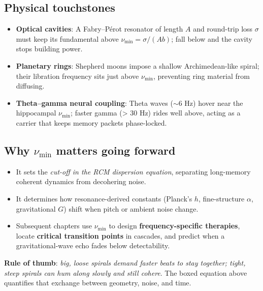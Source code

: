 \subsection{Physical touchstones}
\begin{itemize}
  \item \textbf{Optical cavities}: A Fabry–Pérot resonator of length \(A\) and round-trip loss \(\sigma\) must keep its fundamental above \(\nu_{\min}=\sigma/(A b)\); fall below and the cavity stops building power.
  \item \textbf{Planetary rings}: Shepherd moons impose a shallow Archimedean-like spiral; their libration frequency sits just above \(\nu_{\min}\), preventing ring material from diffusing.
  \item \textbf{Theta–gamma neural coupling}: Theta waves (\(\sim6\) Hz) hover near the hippocampal \(\nu_{\min}\); faster gamma (> 30 Hz) rides well above, acting as a carrier that keeps memory packets phase-locked.
\end{itemize}

\subsection{Why \(\nu_{\min}\) matters going forward}
\begin{itemize}
  \item It sets the \emph{cut-off in the RCM dispersion equation}, separating long-memory coherent dynamics from decohering noise.
  \item It determines how resonance-derived constants (Planck’s \(h\), fine-structure \(\alpha\), gravitational \(G\)) shift when pitch or ambient noise change.
  \item Subsequent chapters use \(\nu_{\min}\) to design \textbf{frequency-specific therapies}, locate \textbf{critical transition points} in cascades, and predict when a gravitational-wave echo fades below detectability.
\end{itemize}

\medskip
\noindent\textbf{Rule of thumb}: \emph{big, loose spirals demand faster beats to stay together; tight, steep spirals can hum along slowly and still cohere}.  
The boxed equation above quantifies that exchange between geometry, noise, and time.


